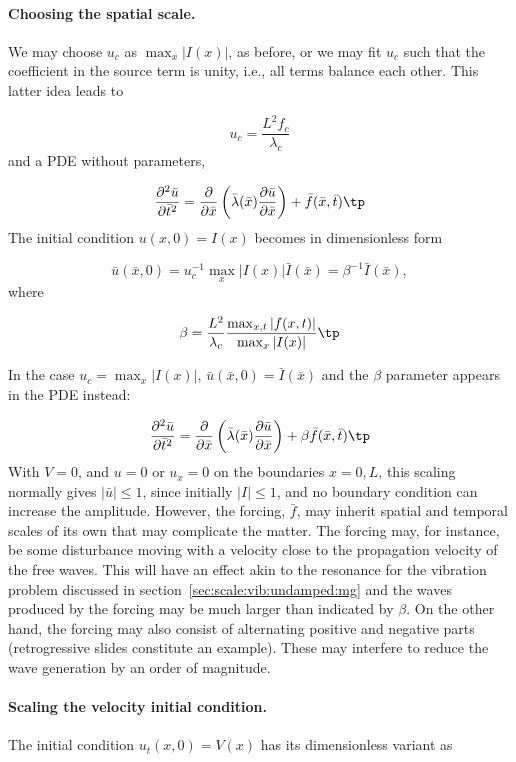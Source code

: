 \documentclass[graybox,envcountchap,sectrefs,final]{svmonodo}
\begin{document}
\paragraph{Choosing the spatial scale.}
We may choose $u_c$ as $\max_x |I(x)|$, as before,
or we may fit $u_c$ such that the coefficient in the source term
is unity, i.e., all terms balance each other.
This latter idea leads to

\[ u_c = \frac{L^2 f_c}{\lambda_c} \]
and a PDE without parameters,

\[
\frac{\partial^2 \bar u}{\partial \bar t^2} =
\frac{\partial}{\partial \bar x}\left(
\bar\lambda(\bar x) {\partial\bar u\over\partial\bar x}\right)
+ \bar f(\bar x,\bar t)\tp
\]
The initial condition $u(x,0)=I(x)$ becomes in dimensionless form

\[ \bar u(\bar x, 0) = u_c^{-1} \max_x |I(x)|\bar I(\bar x) =
\beta^{-1}\bar I(\bar x),\]
where

\[ \beta = \frac{L^2}{\lambda_c}\frac{\max_{x,t} |f(x,t)|}{\max_x|I(x)|}\tp\]

In the case $u_c=\max_x|I(x)|$, $\bar u(\bar x,0)=\bar I(\bar x)$ and
the $\beta$ parameter appears in the PDE instead:

\[
\frac{\partial^2 \bar u}{\partial \bar t^2} =
\frac{\partial}{\partial \bar x}\left(
\bar\lambda(\bar x) {\partial\bar u\over\partial\bar x}\right)
+ \beta \bar f(\bar x,\bar t)\tp
\]
With $V=0$, and $u=0$ or $u_x=0$ on the boundaries $x=0,L$, this scaling normally gives
$|\bar u|\leq 1$, since initially $|I|\leq 1$, and no boundary condition
can increase the amplitude.
However, the forcing, $\bar f$, may inherit spatial and temporal scales of its
own that may complicate the matter. The forcing may, for instance, be
some disturbance moving with a velocity close to the propagation velocity of
the free waves. This will have an effect akin to the resonance for the vibration problem discussed in
section~\ref{sec:scale:vib:undamped:mg} and the waves produced by the forcing may be much larger than
indicated by $\beta$. On the other hand, the forcing may also consist
of alternating positive and negative parts (retrogressive slides constitute an
example). These may interfere to
reduce the wave generation by an order of magnitude.

\paragraph{Scaling the velocity initial condition.}
The initial condition $u_t(x,0)=V(x)$ has its dimensionless variant as
\end{document}
